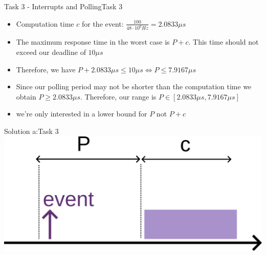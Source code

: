 \begin{frame}[fragile]{Task 3 - Interrupts and Polling}{Task 3}
  \begin{solution}
        \begin{itemize}
          \item Computation time $c$ for the event: $\frac{100}{48 \cdot 10^6 Hz} = 2.0833\mu s$
          \item The maximum response time in the worst case is $P + c$. This time should not exceed our deadline of $10 \mu s$
          \item Therefore, we have $P + 2.0833\mu s \leq 10\mu s \Longleftrightarrow P \leq 7.9167\mu s$
          \item Since our polling period may not be shorter than the computation time we obtain $P \geq 2.0833\mu s$. Therefore, our range is $P \in [2.0833\mu s, 7.9167\mu s]$
          \item we're only interested in a lower bound for $P$ not $P+c$
        \end{itemize}
  \end{solution}
\end{frame}

\begin{frame}{Solution a:}{Task 3}
  \centering
  \includegraphics[height=0.4\paperheight]{figures/task3-a.png}
\end{frame}

